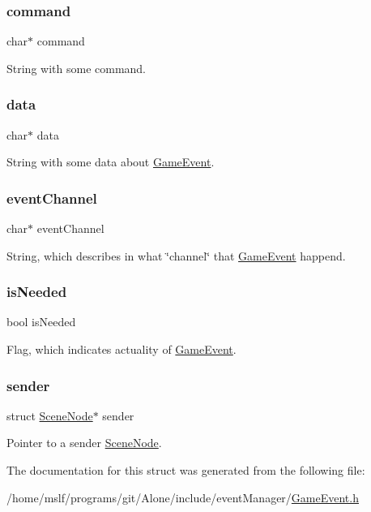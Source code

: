 \subsubsection{\texorpdfstring{command}{command}}
{\footnotesize\ttfamily char$\ast$ command}

String with some command. \hypertarget{struct_game_event_a91a70b77df95bd8b0830b49a094c2acb}{}\label{struct_game_event_a91a70b77df95bd8b0830b49a094c2acb} 
\subsubsection{\texorpdfstring{data}{data}}
{\footnotesize\ttfamily char$\ast$ data}

String with some data about \hyperlink{struct_game_event}{Game\+Event}. \hypertarget{struct_game_event_a7dda51a2020c9e6ea2d284527a6c0a3c}{}\label{struct_game_event_a7dda51a2020c9e6ea2d284527a6c0a3c} 
\subsubsection{\texorpdfstring{event\+Channel}{eventChannel}}
{\footnotesize\ttfamily char$\ast$ event\+Channel}

String, which describes in what \char`\"{}channel\char`\"{} that \hyperlink{struct_game_event}{Game\+Event} happend. \hypertarget{struct_game_event_a1c2e66c0da32aeb6b56a788ad2beee8c}{}\label{struct_game_event_a1c2e66c0da32aeb6b56a788ad2beee8c} 
\subsubsection{\texorpdfstring{is\+Needed}{isNeeded}}
{\footnotesize\ttfamily bool is\+Needed}

Flag, which indicates actuality of \hyperlink{struct_game_event}{Game\+Event}. \hypertarget{struct_game_event_a66ff5dae3a3a9fa193714623f219c11d}{}\label{struct_game_event_a66ff5dae3a3a9fa193714623f219c11d} 
\subsubsection{\texorpdfstring{sender}{sender}}
{\footnotesize\ttfamily struct \hyperlink{struct_scene_node}{Scene\+Node}$\ast$ sender}

Pointer to a sender \hyperlink{struct_scene_node}{Scene\+Node}. 

The documentation for this struct was generated from the following file\+:\begin{DoxyCompactItemize}
\item 
/home/mslf/programs/git/\+Alone/include/event\+Manager/\hyperlink{_game_event_8h}{Game\+Event.\+h}\end{DoxyCompactItemize}
